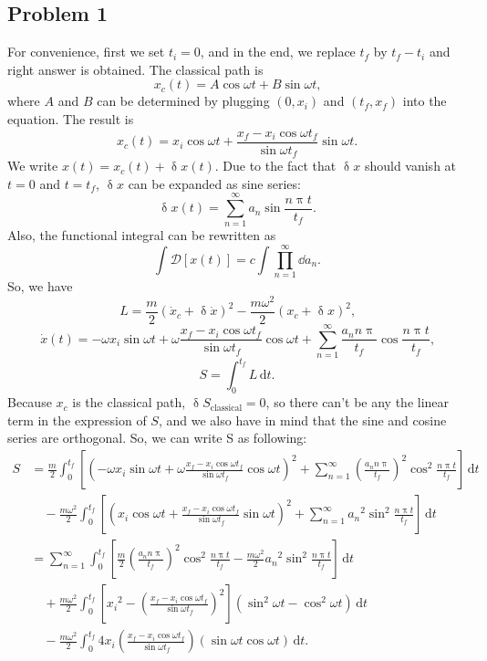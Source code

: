 \documentclass { article }
\begin{document}
\newcommand{\lb}{\left(}
\newcommand{\rb}{\right)}
\newcommand{\ec}{\text{,}}
\newcommand{\ed}{\text{.}}
\newcommand{\bt}{\lb t\rb}
\newcommand{\deltaup}{\updelta}
\newcommand{\piup}{\uppi}
\newcommand{\ndd}{\,\mathrm{d}}
\subsection*{Problem 1}
For convenience, first we set $t_i=0$, and in the end, we replace $t_f$ by $t_f-t_i$ and right answer is obtained.
The classical path is \[x_c\lb t\rb=A \cos\omega t+B\sin \omega t\ec\]where $A$ and $B$ can be determined by plugging $\lb0,x_i\rb$ and $\lb t_f, x_f\rb$ into the equation. The result is
\[x_c\lb t\rb=x_i \cos\omega t+\frac{x_f-x_i\cos\omega t_f}{\sin\omega t_f}\sin \omega t\ed\]
We write $x\lb t\rb=x_c\lb t\rb+\deltaup x\bt$. Due to the fact that $\deltaup x$ should vanish at $t=0$ and $t=t_f$, $\deltaup x$ can be expanded as sine series: \[\deltaup x\bt=\sum_{n=1}^\infty a_n\sin\frac{n\piup t}{t_f}\ed\]
Also, the functional integral can be rewritten as \[\int\mathcal{D}\left[x\bt\right]=c\int\prod_{n=1}^\infty \dd a_n\ed\]
So, we have
\[L=\frac{m}{2}\lb\dot{x}_c+\deltaup\dot{x}\rb^2-\frac{m\omega^2}{2}\lb x_c+\deltaup x\rb^2\ec\]
\[\dot{x}\bt=-\omega x_i \sin\omega t +\omega \frac{x_f-x_i\cos\omega t_f}{\sin\omega t_f}\cos\omega t+\sum_{n=1}^\infty\frac{a_n n \piup}{t_f}\cos\frac{n \piup t}{t_f}\ec\]
\[S=\int_0^{t_f} L\ndd t\ed\]
Because $x_c$ is the classical path, $\deltaup S_\text{classical}=0$, so there can't be any the linear term in the expression of $S$, and we also have in mind that the sine and cosine series are orthogonal. So, we can write S as following:
\[\begin{split}S&{}=\frac{m}{2}\int_0^{t_f}\left[\lb-\omega x_i\sin\omega t+\omega \frac{x_f-x_i\cos\omega t_f}{\sin\omega t_f}\cos\omega t\rb^2+\sum_{n=1}^\infty\lb\frac{a_n n \piup}{t_f}\rb^2\cos^2\frac{n \piup t}{t_f}\right]\ndd t\\%
&\quad{}-\frac{m\omega^2}{2}\int_0^{t_f}\left[\lb x_i\cos\omega t+ \frac{x_f-x_i\cos\omega t_f}{\sin\omega t_f}\sin\omega t\rb^2+\sum_{n=1}^\infty {a_n}^2\sin^2\frac{n \piup t}{t_f}\right]\ndd t\\%
&{}=\sum_{n=1}^\infty\int_0^{t_f}\left[\frac{m}{2}\lb\frac{a_n n \piup}{t_f}\rb^2\cos^2\frac{n \piup t}{t_f}-\frac{m\omega^2}{2}{a_n}^2\sin^2\frac{n \piup t}{t_f}\right]\ndd t\\%
&\quad{}+\frac{m\omega^2}{2}\int_0^{t_f}\left[ {x_i}^2-\lb\frac{x_f-x_i\cos\omega t_f}{\sin\omega t_f}\rb^2\right]\lb\sin^2\omega t-\cos^2\omega t\rb\ndd t\\%
&\quad{}-\frac{m\omega^2}{2}\int_0^{t_f}4 {x_i}\lb\frac{x_f-x_i\cos\omega t_f}{\sin\omega t_f}\rb\lb\sin\omega t\cos\omega t\rb\ndd t\ed\end{split}\]
\end{document}
